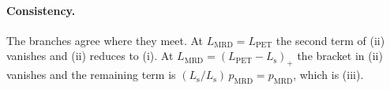 \documentclass[11pt,a4paper]{article}
\newcommand{\Lpet}{L_{\mathrm{PET}}}
\newcommand{\Lsrc}{L_{\mathrm{s}}}
\newcommand{\Lmrd}{L_{\mathrm{MRD}}}
\begin{document}
\paragraph{Consistency.} The branches agree where they meet. At $\Lmrd=\Lpet$ the second
term of (ii) vanishes and (ii) reduces to (i). At $\Lmrd=(\Lpet-\Lsrc)_+$ the bracket in
(ii) vanishes and the remaining term is $(\Lsrc/\Lsrc)\,p_{\mathrm{MRD}}=p_{\mathrm{MRD}}$,
which is (iii).
\end{document}
